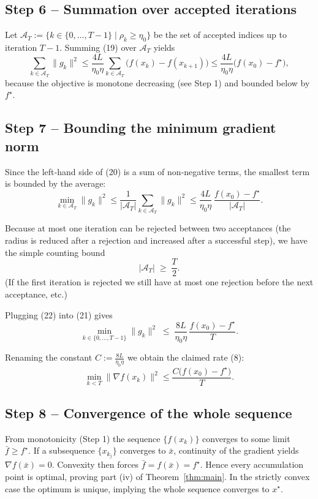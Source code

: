 \documentclass[11pt]{article}
\begin{document}
\subsection*{Step 6 – Summation over accepted iterations}
Let \(\mathcal{A}_T:=\{k\in\{0,\dots,T-1\}\mid\rho_k\ge\eta_0\}\) be the set of accepted indices up to iteration \(T-1\). Summing (19) over \(\mathcal{A}_T\) yields
\[
\sum_{k\in\mathcal{A}_T}\|g_k\|^{2}
\le
\frac{4L}{\eta_0\eta}\sum_{k\in\mathcal{A}_T}\bigl(f(x_k)-f(x_{k+1})\bigr)
\le
\frac{4L}{\eta_0\eta}\bigl(f(x_0)-f^{\star}\bigr),
\tag{20}
\]
because the objective is monotone decreasing (see Step 1) and bounded below by \(f^{\star}\).

\subsection*{Step 7 – Bounding the minimum gradient norm}
Since the left‑hand side of (20) is a sum of non‑negative terms, the smallest term is bounded by the average:
\[
\min_{k\in\mathcal{A}_T}\|g_k\|^{2}
\le
\frac{1}{|\mathcal{A}_T|}\sum_{k\in\mathcal{A}_T}\|g_k\|^{2}
\le
\frac{4L}{\eta_0\eta}\,\frac{f(x_0)-f^{\star}}{|\mathcal{A}_T|}.
\tag{21}
\]

Because at most one iteration can be rejected between two acceptances (the radius is reduced after a rejection and increased after a successful step), we have the simple counting bound
\[
|\mathcal{A}_T|\;\ge\;\frac{T}{2}.
\tag{22}
\]
(If the first iteration is rejected we still have at most one rejection before the next acceptance, etc.)

Plugging (22) into (21) gives
\[
\min_{k\in\{0,\dots,T-1\}}\|g_k\|^{2}
\;\le\;
\frac{8L}{\eta_0\eta}\,\frac{f(x_0)-f^{\star}}{T}.
\tag{23}
\]

Renaming the constant \(C:=\frac{8L}{\eta_0\eta}\) we obtain the claimed rate (8):
\[
\boxed{\displaystyle
\min_{k<T}\|\nabla f(x_k)\|^{2}\le
\frac{C\bigl(f(x_0)-f^{\star}\bigr)}{T}}.
\]

\subsection*{Step 8 – Convergence of the whole sequence}
From monotonicity (Step 1) the sequence \(\{f(x_k)\}\) converges to some limit \(\bar f\ge f^{\star}\).  
If a subsequence \(\{x_{k_j}\}\) converges to \(\bar x\), continuity of the gradient yields \(\nabla f(\bar x)=0\).  
Convexity then forces \(\bar f=f(\bar x)=f^{\star}\). Hence every accumulation point is optimal, proving part (iv) of Theorem~\ref{thm:main}. In the strictly convex case the optimum is unique, implying the whole sequence converges to \(x^{\star}\).
\end{document}
